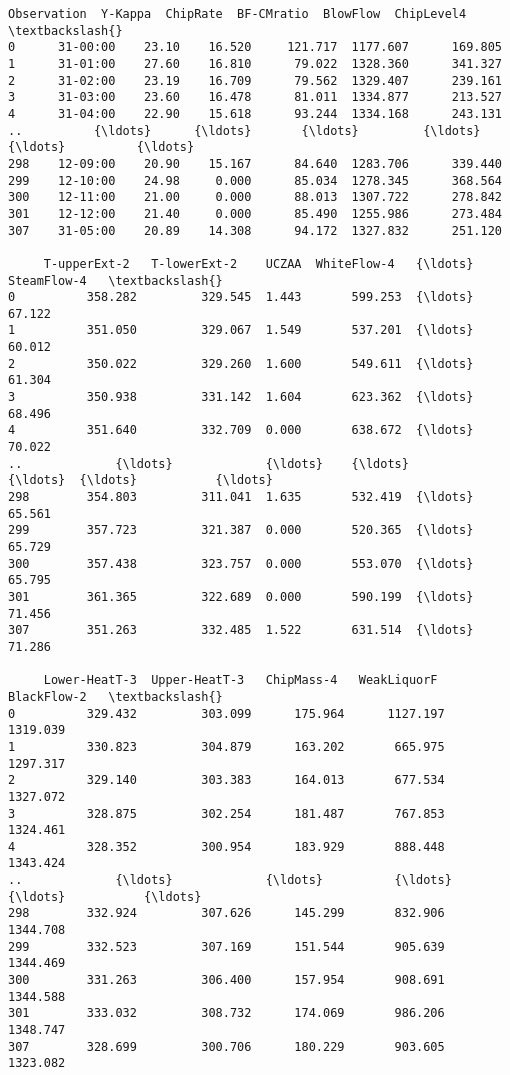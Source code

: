 \documentclass[11pt]{article}
\makeatletter
\newcommand{\boxspacing}{\kern\kvtcb@left@rule\kern\kvtcb@boxsep}
\newcommand{\prompt}[4]{
        {\ttfamily\llap{{\color{#2}[#3]:\hspace{3pt}#4}}\vspace{-\baselineskip}}
    }
\makeatother
\begin{document}
            \begin{tcolorbox}[breakable, size=fbox, boxrule=.5pt, pad at break*=1mm, opacityfill=0]
\prompt{Out}{outcolor}{12}{\boxspacing}
\begin{Verbatim}[commandchars=\\\{\}]
    Observation  Y-Kappa  ChipRate  BF-CMratio  BlowFlow  ChipLevel4   \textbackslash{}
0      31-00:00    23.10    16.520     121.717  1177.607      169.805
1      31-01:00    27.60    16.810      79.022  1328.360      341.327
2      31-02:00    23.19    16.709      79.562  1329.407      239.161
3      31-03:00    23.60    16.478      81.011  1334.877      213.527
4      31-04:00    22.90    15.618      93.244  1334.168      243.131
..          {\ldots}      {\ldots}       {\ldots}         {\ldots}       {\ldots}          {\ldots}
298    12-09:00    20.90    15.167      84.640  1283.706      339.440
299    12-10:00    24.98     0.000      85.034  1278.345      368.564
300    12-11:00    21.00     0.000      88.013  1307.722      278.842
301    12-12:00    21.40     0.000      85.490  1255.986      273.484
307    31-05:00    20.89    14.308      94.172  1327.832      251.120

     T-upperExt-2   T-lowerExt-2    UCZAA  WhiteFlow-4   {\ldots}  SteamFlow-4   \textbackslash{}
0          358.282         329.545  1.443       599.253  {\ldots}        67.122
1          351.050         329.067  1.549       537.201  {\ldots}        60.012
2          350.022         329.260  1.600       549.611  {\ldots}        61.304
3          350.938         331.142  1.604       623.362  {\ldots}        68.496
4          351.640         332.709  0.000       638.672  {\ldots}        70.022
..             {\ldots}             {\ldots}    {\ldots}           {\ldots}  {\ldots}           {\ldots}
298        354.803         311.041  1.635       532.419  {\ldots}        65.561
299        357.723         321.387  0.000       520.365  {\ldots}        65.729
300        357.438         323.757  0.000       553.070  {\ldots}        65.795
301        361.365         322.689  0.000       590.199  {\ldots}        71.456
307        351.263         332.485  1.522       631.514  {\ldots}        71.286

     Lower-HeatT-3  Upper-HeatT-3   ChipMass-4   WeakLiquorF   BlackFlow-2   \textbackslash{}
0          329.432         303.099      175.964      1127.197      1319.039
1          330.823         304.879      163.202       665.975      1297.317
2          329.140         303.383      164.013       677.534      1327.072
3          328.875         302.254      181.487       767.853      1324.461
4          328.352         300.954      183.929       888.448      1343.424
..             {\ldots}             {\ldots}          {\ldots}           {\ldots}           {\ldots}
298        332.924         307.626      145.299       832.906      1344.708
299        332.523         307.169      151.544       905.639      1344.469
300        331.263         306.400      157.954       908.691      1344.588
301        333.032         308.732      174.069       986.206      1348.747
307        328.699         300.706      180.229       903.605      1323.082


\end{Verbatim}
\end{tcolorbox}
\end{document}
